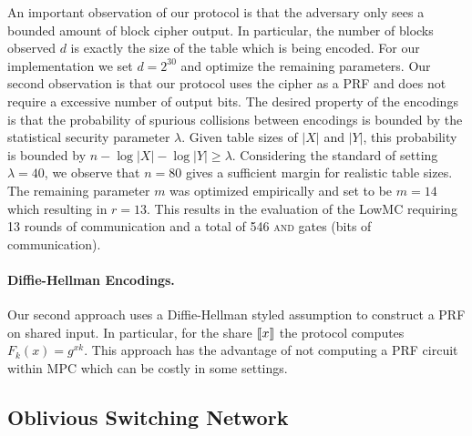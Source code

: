 An important observation of our protocol is that the adversary only sees a bounded amount of block cipher output. In particular, the number of blocks observed $d$ is exactly the size of the table which is being encoded. For our implementation we set $d=2^{30}$ and optimize the remaining parameters. Our second observation is that our protocol uses the cipher as a PRF and does not require a excessive number of output bits. The desired property of the encodings is that the probability of spurious collisions between encodings is bounded by the statistical security parameter $\lambda$. Given table sizes of $|X|$ and $|Y|$, this probability is bounded by $n-\log |X|-\log |Y|\geq \lambda$. Considering the standard of setting $\lambda=40$, we observe that $n=80$ gives a sufficient margin for realistic table sizes. The remaining parameter $m$ was optimized empirically and set to be $m=14$ which resulting in $r=13$. This results in the evaluation of the LowMC requiring 13 rounds of communication and a total of 546 \textsc{and} gates (bits of communication).



\paragraph{Diffie-Hellman Encodings.} Our second approach uses a Diffie-Hellman styled assumption to construct a PRF on shared input. In particular, for the share $\llbracket x\rrbracket$ the protocol computes $F_k(x) = g^{xk}$. This approach has the advantage of not computing a PRF circuit within MPC which can be costly in some settings.





\subsection{Oblivious Switching Network}

